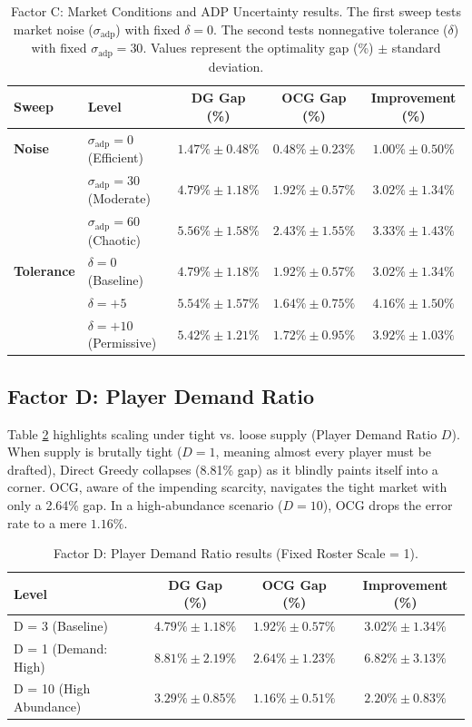 \documentclass[11pt,a4paper]{article}
\begin{document}
\begin{table}[H]
\centering
\caption{Factor C: Market Conditions and ADP Uncertainty results. The first sweep tests market noise ($\sigma_{\text{adp}}$) with fixed $\delta=0$. The second tests nonnegative tolerance ($\delta$) with fixed $\sigma_{\text{adp}}=30$. Values represent the optimality gap (\%) $\pm$ standard deviation.}
\label{tab:factor_3}
\begin{tabular}{llccc}
\toprule
Sweep & Level & DG Gap (\%) & OCG Gap (\%) & Improvement (\%) \\
\midrule
\textbf{Noise} & $\sigma_{\text{adp}}=0$ (Efficient) & $1.47\% \pm 0.48\%$ & $\mathbf{0.48\% \pm 0.23\%}$ & $1.00\% \pm 0.50\%$ \\
 & $\sigma_{\text{adp}}=30$ (Moderate) & $4.79\% \pm 1.18\%$ & $\mathbf{1.92\% \pm 0.57\%}$ & $3.02\% \pm 1.34\%$ \\
 & $\sigma_{\text{adp}}=60$ (Chaotic) & $5.56\% \pm 1.58\%$ & $\mathbf{2.43\% \pm 1.55\%}$ & $\mathbf{3.33\% \pm 1.43\%}$ \\
\midrule
\textbf{Tolerance} & $\delta=0$ (Baseline) & $4.79\% \pm 1.18\%$ & $\mathbf{1.92\% \pm 0.57\%}$ & $3.02\% \pm 1.34\%$ \\
 & $\delta=+5$ & $5.54\% \pm 1.57\%$ & $\mathbf{1.64\% \pm 0.75\%}$ & $\mathbf{4.16\% \pm 1.50\%}$ \\
 & $\delta=+10$ (Permissive) & $5.42\% \pm 1.21\%$ & $\mathbf{1.72\% \pm 0.95\%}$ & $3.92\% \pm 1.03\%$ \\
\bottomrule
\end{tabular}
\end{table}

\subsection{Factor D: Player Demand Ratio}

Table \ref{tab:factor_4} highlights scaling under tight vs. loose supply (Player Demand Ratio $D$). When supply is brutally tight ($D=1$, meaning almost every player must be drafted), Direct Greedy collapses (8.81\% gap) as it blindly paints itself into a corner. OCG, aware of the impending scarcity, navigates the tight market with only a 2.64\% gap. In a high-abundance scenario ($D=10$), OCG drops the error rate to a mere $1.16\%$.

\begin{table}[H]
\centering
\caption{Factor D: Player Demand Ratio results (Fixed Roster Scale = 1). }
\label{tab:factor_4}
\begin{tabular}{lccc}
\toprule
Level & DG Gap (\%) & OCG Gap (\%) & Improvement (\%) \\
\midrule
D = 3 (Baseline) & $4.79\% \pm 1.18\%$ & $\mathbf{1.92\% \pm 0.57\%}$ & $3.02\% \pm 1.34\%$ \\
D = 1 (Demand: High) & $8.81\% \pm 2.19\%$ & $\mathbf{2.64\% \pm 1.23\%}$ & $\mathbf{6.82\% \pm 3.13\%}$ \\
D = 10 (High Abundance) & $3.29\% \pm 0.85\%$ & $\mathbf{1.16\% \pm 0.51\%}$ & $2.20\% \pm 0.83\%$ \\
\bottomrule
\end{tabular}
\end{table}
\end{document}
